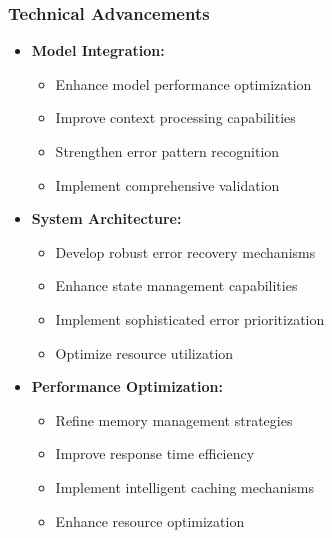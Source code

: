 \subsubsection{Technical Advancements}
\begin{itemize}
    \item \textbf{Model Integration:}
        \begin{itemize}
            \item Enhance model performance optimization
            \item Improve context processing capabilities
            \item Strengthen error pattern recognition
            \item Implement comprehensive validation
        \end{itemize}
    \item \textbf{System Architecture:}
        \begin{itemize}
            \item Develop robust error recovery mechanisms
            \item Enhance state management capabilities
            \item Implement sophisticated error prioritization
            \item Optimize resource utilization
        \end{itemize}
    \item \textbf{Performance Optimization:}
        \begin{itemize}
            \item Refine memory management strategies
            \item Improve response time efficiency
            \item Implement intelligent caching mechanisms
            \item Enhance resource optimization
        \end{itemize}
\end{itemize}

